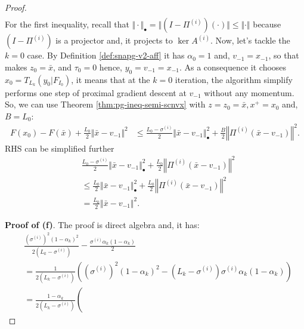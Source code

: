 \documentclass[12pt]{article}
\begin{document}
\begin{proof}
\begin{align*}
        \end{align*}
        For the first inequality, recall that $\Vert \cdot\Vert_\bullet = \Vert (I - \Pi^{(i)})(\cdot)\Vert \le \Vert \cdot\Vert$ because $(I - \Pi^{(i)})$ is a projector and, it projects to $\ker A^{(i)}$. 
        Now, let's tackle the $k = 0$ case. 
        By Definition \ref{def:snapg-v2-aff} it has $\alpha_0 = 1$ and, $v_{- 1} = x_{- 1}$, so that makes $z_0 = \bar x$, and $\tau_0 = 0$ hence, $y_0 = v_{-1} = x_{-1}$. 
        As a consequence it chooses $x_0 = T_{L_k}(y_0 | F_{I_0})$, it means that at the $k = 0$ iteration, the algorithm simplify performs one step of proximal gradient descent at $v_{-1}$ without any momentum. 
        So, we can use Theorem \ref{thm:pg-ineq-semi-scnvx} with $z = z_0 = \bar x, x^+ = x_0$ and, $B = L_0$: 
        \begin{align*}
            F(x_0) - F(\bar x) + \frac{L_0}{2}\Vert \bar x - v_{-1}\Vert^2 
            &\le 
            \frac{L_0 - \sigma^{(i)}}{2}\Vert \bar x - v_{-1} \Vert^2_\bullet
            + \frac{B}{2}\left\Vert \Pi^{(i)}(\bar x - v_{-1})\right\Vert^2. 
        \end{align*}
        RHS can be simplified further
        \begin{align*}
            & \frac{L_0 - \sigma^{(i)}}{2}\Vert \bar x - v_{-1} \Vert^2_\bullet
            + \frac{L_0}{2}\left\Vert \Pi^{(i)}(\bar x - v_{-1})\right\Vert^2
            \\
            &\le \frac{L_0}{2}\Vert \bar x - v_{-1} \Vert^2_\bullet
            + \frac{L_0}{2}\left\Vert \Pi^{(i)}(\bar x - v_{-1})\right\Vert^2
            \\
            & = \frac{L_0}{2}\Vert \bar x - v_{-1}\Vert^2. 
        \end{align*}
        \par
        \textbf{Proof of (f)}. 
        The proof is direct algebra and, it has: 
        {\small\allowdisplaybreaks
        \begin{align*}
            & \frac{\left(\sigma^{(i)}\right)^2(1 - \alpha_k)^2}{2(L_k - \sigma^{(i)})} 
            - \frac{\sigma^{(i)}\alpha_k(1 - \alpha_k)}{2}
            \\
            &= 
            \frac{1}{2\left(L_k - \sigma^{(i)}\right)}
            \left(
                \left(\sigma^{(i)}\right)^2(1 - \alpha_k)^2
                - \left(L_k - \sigma^{(i)}\right)\sigma^{(i)} \alpha_k(1 - \alpha_k)
            \right)
            \\
            &= \frac{1 - \alpha_k}{2\left(L_k - \sigma^{(i)}\right)}\left(

\end{align*}}
\end{proof}
\end{document}
